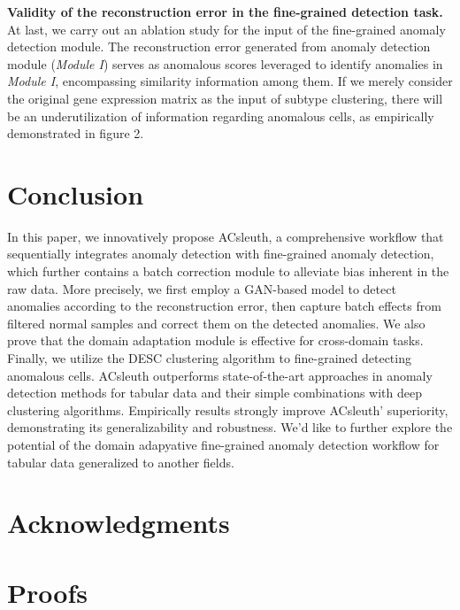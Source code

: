 \documentclass{article}
\begin{document}
\textbf{Validity of the reconstruction error in the fine-grained detection task.}	At last, we carry out an 
ablation study for the input of the fine-grained anomaly detection module. The 
reconstruction error generated from anomaly detection module (\textit{Module I}) serves as 
anomalous scores leveraged to identify anomalies in \textit{Module I}, encompassing similarity 
information among them. If we merely consider the original gene expression matrix as the 
input of subtype clustering, there will be an underutilization of information regarding 
anomalous cells, as empirically demonstrated in figure 2.
\section{Conclusion}
In this paper, we innovatively propose ACsleuth, a comprehensive workflow that sequentially 
integrates anomaly detection with fine-grained anomaly detection, which further contains a batch 
correction module to alleviate bias inherent in the raw data. More precisely, we first 
employ a GAN-based model to detect anomalies according to the reconstruction error, then 
capture batch effects from filtered normal samples and correct them on the detected 
anomalies. We also prove that the domain adaptation module is effective for cross-domain tasks. 
Finally, we utilize the DESC clustering algorithm to fine-grained detecting anomalous cells. 
ACsleuth outperforms state-of-the-art approaches in anomaly detection methods for tabular 
data and their simple combinations with deep clustering algorithms. Empirically results 
strongly improve ACsleuth’ superiority, demonstrating its generalizability and robustness. 
We’d like to further explore the potential of the domain adapyative fine-grained anomaly 
detection workflow for tabular data generalized to another fields.
\section*{Acknowledgments}







\appendix

\section{Proofs}
\end{document}

